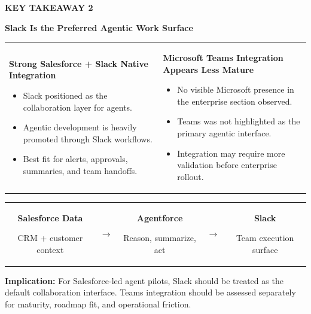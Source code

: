 \documentclass[11pt]{article}
\newcommand{\slide}[1]{%
  \clearpage
  \begin{tcolorbox}[
    enhanced,
    colback=white,
    colframe=line,
    boxrule=0.6pt,
    arc=4pt,
    width=\textwidth,
    height=9.0in,
    left=14pt,
    right=14pt,
    top=14pt,
    bottom=14pt
  ]
  #1
  \end{tcolorbox}
}
\newcommand{\kicker}[1]{\textcolor{dark}{\footnotesize\bfseries\MakeUppercase{#1}}\vspace{6pt}}
\newcommand{\slidetitle}[1]{{\color{ink}\LARGE\bfseries #1}\par\vspace{12pt}}
\newcommand{\boxtitle}[1]{{\bfseries #1}\par}
\newcommand{\smallmuted}[1]{{\small\textcolor{muted}{#1}}}
\begin{document}
\slide{
  \kicker{Key Takeaway 2}\par
  \slidetitle{Slack Is the Preferred Agentic Work Surface}
  \begin{tabularx}{\textwidth}{XX}
    \begin{plainbox}
      \boxtitle{Strong Salesforce + Slack Native Integration}
      \begin{itemize}
        \item Slack positioned as the collaboration layer for agents.
        \item Agentic development is heavily promoted through Slack workflows.
        \item Best fit for alerts, approvals, summaries, and team handoffs.
      \end{itemize}
    \end{plainbox}
    &
    \begin{plainbox}
      \boxtitle{Microsoft Teams Integration Appears Less Mature}
      \begin{itemize}
        \item No visible Microsoft presence in the enterprise section observed.
        \item Teams was not highlighted as the primary agentic interface.
        \item Integration may require more validation before enterprise rollout.
      \end{itemize}
    \end{plainbox}
  \end{tabularx}
  \vspace{18pt}
  \begin{center}
    \begin{tabular}{ccccc}
      \begin{plainbox}[width=1.8in]\boxtitle{Salesforce Data}\smallmuted{CRM + customer context}\end{plainbox}
      & \(\rightarrow\) &
      \begin{plainbox}[width=1.7in]\boxtitle{Agentforce}\smallmuted{Reason, summarize, act}\end{plainbox}
      & \(\rightarrow\) &
      \begin{plainbox}[width=1.55in]\boxtitle{Slack}\smallmuted{Team execution surface}\end{plainbox}
    \end{tabular}
  \end{center}
  \vfill
  \begin{calloutbox}
    \textbf{Implication:} For Salesforce-led agent pilots, Slack should be treated as the default collaboration interface. Teams integration should be assessed separately for maturity, roadmap fit, and operational friction.
  \end{calloutbox}
}
\end{document}
